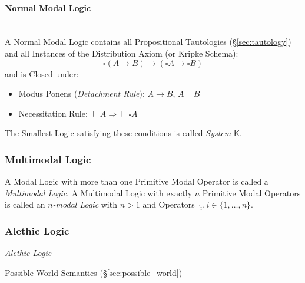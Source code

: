 \paragraph{Normal Modal Logic}\label{sec:normal_modal}
\hfill \\

A Normal Modal Logic contains all Propositional Tautologies
(\S\ref{sec:tautology}) and all Instances of the Distribution Axiom
(or Kripke Schema):
\[
  \square (A \rightarrow B) \rightarrow
  (\square A \rightarrow \square B)
\]
and is Closed under:
\begin{itemize}
  \item Modus Ponens (\emph{Detachment Rule}): $A \rightarrow B$, $A
    \vdash B$
  \item Necessitation Rule: $\vdash A \Rightarrow \vdash \square A$
\end{itemize}
The Smallest Logic satisfying these conditions is called \emph{System
  $\mathsf{K}$}.



\subsubsection{Multimodal Logic}\label{sec:multimodal_logic}

A Modal Logic with more than one Primitive Modal Operator is called a
\emph{Multimodal Logic}. A Multimodal Logic with exactly $n$ Primitive
Modal Operators is called an \emph{$n$-modal Logic} with $n > 1$ and
Operators $\square_i, i \in \{1, \ldots, n\}$.



\subsubsection{Alethic Logic}\label{sec:alethic_logic}

\emph{Alethic Logic}

Possible World Semantics (\S\ref{sec:possible_world})


